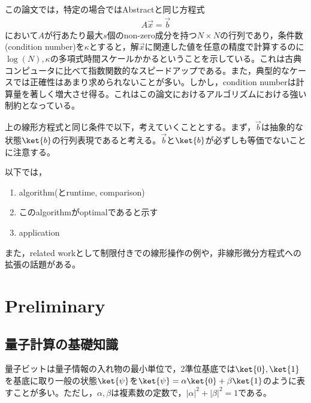 \documentclass[b5paper,papersize,fleqn]{jsarticle}
\begin{document}

この論文では，特定の場合ではAbstractと同じ方程式
\begin{eqnarray}
  A\vec{x} = \vec{b}
\end{eqnarray}
において$A$が行あたり最大$s$個のnon-zero成分を持つ$N\times N$の行列であり，条件数(condition number)を$\kappa $とすると，解$\vec{x}$に関連した値を任意の精度で計算するのに$\log(N),\kappa $の多項式時間スケールかかるということを示している。これは古典コンピュータに比べて指数関数的なスピードアップである。また，典型的なケースでは正確性はあまり求められないことが多い。しかし，condition numberは計算量を著しく増大させ得る。これはこの論文におけるアルゴリズムにおける強い制約となっている。

上の線形方程式と同じ条件で以下，考えていくこととする。まず，$\vec{b}$は抽象的な状態$\ket{b}$の行列表現であると考える。$\vec{b}$と$\ket{b}$が必ずしも等価でないことに注意する。


以下では，
\begin{enumerate}
  \item algorithm(とruntime, comparison)
  \item このalgorithmがoptimalであると示す
  \item application
\end{enumerate}


また，related workとして制限付きでの線形操作の例や，非線形微分方程式への拡張の話題がある。

\section{Preliminary}
\subsection{量子計算の基礎知識}
量子ビットは量子情報の入れ物の最小単位で，2準位基底では$\ket{0}, \ket{1}$を基底に取り一般の状態$\ket{\psi }$を$\ket{\psi }= \alpha \ket{0}+\beta \ket{1}$のように表すことが多い。ただし，$\alpha, \beta$は複素数の定数で，$|\alpha|^2 + |\beta|^2 = 1$である。
\end{document}
